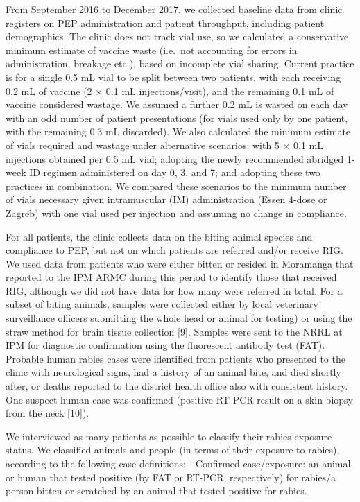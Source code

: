 \documentclass[
  oneside]{book}
\begin{document}
From September 2016 to December 2017, we collected baseline data from clinic registers on PEP administration and patient throughput, including patient demographics. The clinic does not track vial use, so we calculated a conservative minimum estimate of vaccine waste (i.e.~not accounting for errors in administration, breakage etc.), based on incomplete vial sharing. Current practice is for a single 0.5 mL vial to be split between two patients, with each receiving 0.2 mL of vaccine (2 × 0.1 mL injections/visit), and the remaining 0.1 mL of vaccine considered wastage. We assumed a further 0.2 mL is wasted on each day with an odd number of patient presentations (for vials used only by one patient, with the remaining 0.3 mL discarded). We also calculated the minimum estimate of vials required and wastage under alternative scenarios: with 5 × 0.1 mL injections obtained per 0.5 mL vial; adopting the newly recommended abridged 1-week ID regimen administered on day 0, 3, and 7; and adopting these two practices in combination. We compared these scenarios to the minimum number of vials necessary given intramuscular (IM) administration (Essen 4-dose or Zagreb) with one vial used per injection and assuming no change in compliance.

For all patients, the clinic collects data on the biting animal species and compliance to PEP, but not on which patients are referred and/or receive RIG. We used data from patients who were either bitten or resided in Moramanga that reported to the IPM ARMC during this period to identify those that received RIG, although we did not have data for how many were referred in total. For a subset of biting animals, samples were collected either by local veterinary surveillance officers submitting the whole head or animal for testing) or using the straw method for brain tissue collection {[}9{]}. Samples were sent to the NRRL at IPM for diagnostic confirmation using the fluorescent antibody test (FAT). Probable human rabies cases were identified from patients who presented to the clinic with neurological signs, had a history of an animal bite, and died shortly after, or deaths reported to the district health office also with consistent history. One suspect human case was confirmed (positive RT-PCR result on a skin biopsy from the neck {[}10{]}).

We interviewed as many patients as possible to classify their rabies exposure status. We classified animals and people (in terms of their exposure to rabies), according to the following case definitions: - Confirmed case/exposure: an animal or human that tested positive (by FAT or RT-PCR, respectively) for rabies/a person bitten or scratched by an animal that tested positive for rabies.
\end{document}
